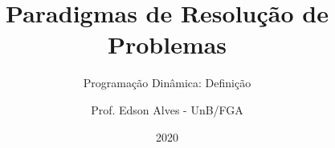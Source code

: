\title{Paradigmas de Resolução de Problemas}
\subtitle{Programação Dinâmica: Definição}
\author{Prof. Edson Alves - UnB/FGA}
\date{2020}
